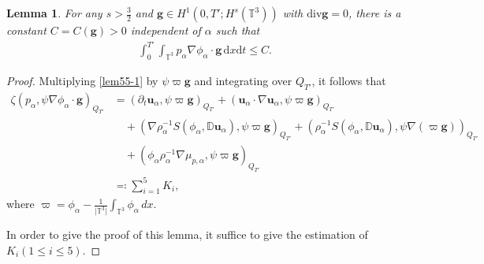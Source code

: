 \documentclass[reqno,a4paper,11pt]{amsart}
\theoremstyle{plain}
\newtheorem{lemma}[theorem]{Lemma}
\numberwithin{equation}{section}
\newcommand{\bb}[1]{\mathbb{#1}}
\newcommand{\bbt}{\bb{T}}
\newcommand{\bg}{\mathbf{g}}
\renewcommand{\d}{\mathrm{d}}
\newcommand{\dx}{\d x}
\newcommand{\dt}{\d t}
\newcommand{\absm}[1]{\vert #1 \vert}
\begin{document}
					
					\begin{lemma}\label{lem:limit 2}
						For any $s>\frac{3}{2}$ and $\bg\in H^{1}(0,T';H^{s}(\mathbb{T}^{3}))$ with $\mathrm{div} \bg=0$,  there is a constant $C=C(\bg)>0$  independent of  $\alpha$ such that
						\begin{align}
							\int_0^{T'}\int_{\mathbb{T}^{3}}p_{\alpha}\nabla\phi_{\alpha}\cdot \bg\,\dx\dt\label{new pp est-00}
							\leq C.
						\end{align}
					\end{lemma}
					\begin{proof}
						Multiplying \eqref{lem55-1} by $\psi\varpi\bg$  and integrating over $Q_{T'}$, it follows that
						\begin{align}
							\nonumber\zeta(p_{\alpha},\psi\nabla\phi_{\alpha} \cdot \bg)_{Q_{T'}}
							&=(\partial_t  \mathbf{u}_{\alpha}, \psi\varpi\bg)_{Q_{T'}} +   (\mathbf{u}_{\alpha}\cdot\nabla
							\mathbf{u}_{\alpha},\psi\varpi\bg)_{Q_{T'}}\nonumber\\&\quad
							+  (\nabla\rho_{\alpha}^{-1}S(\phi_{\alpha},\mathbb{ D}\mathbf{u}_{\alpha}), \psi\varpi \bg)_{Q_{T'}}+  (\rho_{\alpha}^{-1}S(\phi_{\alpha},\mathbb{ D}\mathbf{u}_{\alpha}), \psi\nabla(\varpi \bg))_{Q_{T'}}\nonumber
							\\&\quad+(\phi_{\alpha}\rho_{\alpha}^{-1} \nabla \mu_{p,\alpha},\psi\varpi\bg)_{Q_{T'}}\nonumber
							\\&\eqqcolon\sum_{i=1}^{5}K_{i},\label{new pp est-000}
						\end{align}
						where $\varpi=\phi_{\alpha} -\frac{1}{\absm{\bbt^3}}\int_{\mathbb{T}^{3}} \phi_{\alpha}\,dx$.
						
					
					
					In order to give the proof of this lemma, it suffice to give the estimation of $K_{i}(1\leq i \leq 5)$.
					

\end{proof}
\end{document}

